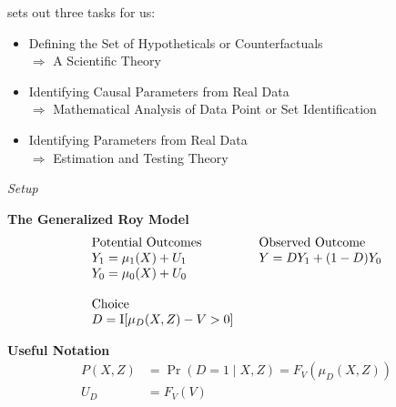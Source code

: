\begin{frame}
	 sets out three tasks for us:
	\begin{itemize}\setlength\itemsep{1em}
		\item Defining the Set of Hypotheticals or Counterfactuals \\\hspace{0.3cm}
		$\Rightarrow$ A Scientific Theory
		\item Identifying Causal Parameters from Real Data \\\hspace{0.3cm}
		$\Rightarrow$ Mathematical Analysis of  Data Point or Set Identification
		\item Identifying Parameters from Real Data\\\hspace{0.3cm}
		$\Rightarrow$ Estimation and Testing Theory
	\end{itemize}
\end{frame}
\begin{frame}\begin{center}
		\LARGE\textit{Setup}
\end{center}\end{frame}
\begin{frame}
	\textbf{The Generalized Roy Model}
	\begin{align*}\begin{array}{l@{\qquad}l}
			\text{Potential Outcomes} &\text{Observed Outcome}\\
			Y_1 = \mu_1(X) + U_1      &  Y = D Y_1 + (1 - D)Y_0 \\
			Y_0 = \mu_0(X) + U_0      &\\
			& \\
			\text{Choice} & \\
			D = \mathrm{I}[\mu_D(X, Z) - V > 0] & \\
		\end{array}
	\end{align*}
\end{frame}
\begin{frame}
	\textbf{Useful Notation}
	\begin{align*}
		P(X, Z) & = \Pr(D = 1\mid X, Z) = F_V(\mu_D(X, Z)) \\
		U_D     & = F_V(V)
	\end{align*}
\end{frame}
